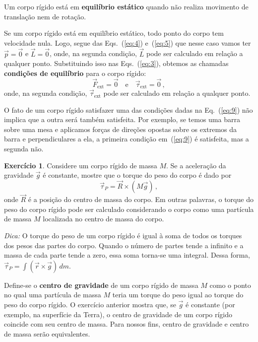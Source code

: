 \documentclass[12pt,a4paper]{article}
\theoremstyle{definition}
\newtheorem{ex}{Exercício}[section]
\begin{document}
Um corpo rígido está em \textbf{equi\-lí\-brio es\-tá\-ti\-co} quando não realiza
movimento de translação nem de rotação.

Se um corpo rígido está em equilíbrio estático, todo ponto do corpo
tem velocidade nula. Logo, segue das Eqs.~(\ref{eq:4}) e~(\ref{eq:5})
que nesse caso vamos ter $\vec p=\vec 0$ e $\vec L=\vec 0$,
onde, na segunda condição, $\vec L$ pode ser calculado em relação a
qualquer ponto. Substituindo isso nas Eqs.~(\ref{eq:3}), obtemos as
chamadas \textbf{condições de equilíbrio} para o corpo rígido:
\begin{equation}
  \label{eq:9}
  {\vec F}_{\mathrm{ext}}=\vec 0\quad\text{e}\quad \vec\tau_{\mathrm{ext}}=\vec 0\,,
\end{equation}
onde, na segunda condição, $\vec\tau_{\mathrm{ext}}$ pode ser
calculado em relação a qualquer ponto.

O fato de um corpo rígido satisfazer uma das condições dadas na
Eq.~(\ref{eq:9}) não implica que a outra será também satisfeita. Por
exemplo, se temos uma barra sobre uma mesa e aplicamos forças de
direções opostas sobre os extremos da barra e perpendiculares a ela, a
primeira condição em~(\ref{eq:9}) é satisfeita, mas a segunda não.

\begin{ex}
  \label{ex:1}
  Considere um corpo rígido de massa $M$. Se a aceleração da gravidade
  $\vec g$ é constante, mostre que o torque do peso do corpo é dado
  por
  $$\vec\tau_P=\vec R\times(M\vec g)\,,$$
  onde $\vec R$ é a posição do
  centro de massa do corpo. Em outras palavras, o torque do peso do
  corpo rígido pode ser calculado considerando o corpo como uma
  partícula de massa $M$ localizada no centro de massa do corpo.

  \noindent\textit{Dica:} O torque do peso de um corpo rígido é igual
  à soma de todos os torques dos pesos das partes do corpo. Quando o
  número de partes tende a infinito e a massa de cada parte tende a
  zero, essa soma torna-se uma integral. Dessa forma,
  $\vec\tau_P=\int (\vec r\times\vec g)\,dm$.
\end{ex}

Define-se o \textbf{centro de gravidade} de um corpo rígido de massa $M$
como o ponto no qual uma partícula de massa $M$ teria um torque do
peso igual ao torque do peso do corpo rígido. O exercício anterior
mostra que, se $\vec g$ é constante (por exemplo, na superfície da
Terra), o centro de gravidade de um corpo rígido coincide com seu
centro de massa. Para nossos fins, centro de gravidade e centro de
massa serão equivalentes.
\end{document}
